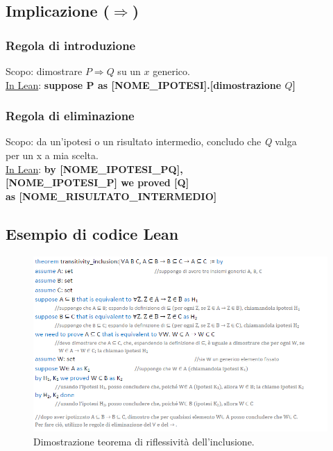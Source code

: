 \documentclass[12pt]{article}
\begin{document}
\subsection{Implicazione ($\Rightarrow$)}
\subsubsection{Regola di introduzione}
Scopo: dimostrare $P \Rightarrow Q$ su un $x$ generico.\\
\underline{In Lean}: \textbf{suppose P as [NOME\_IPOTESI].[dimostrazione $Q$]}
\subsubsection{Regola di eliminazione}
Scopo: da un'ipotesi o un risultato intermedio, concludo che \textit{Q} valga\\
per un x a mia scelta.\\
\underline{In Lean}: 
\textbf{by [NOME\_IPOTESI\_PQ],}\\
\textbf{[NOME\_IPOTESI\_P] we proved [Q]}\\
\textbf{as [NOME\_RISULTATO\_INTERMEDIO]}
\pagebreak
\subsection{Esempio di codice Lean}
\begin{figure}[!htb]
    \centering
    \includegraphics[height=.50\textheight,keepaspectratio]{lezione_1.50/lean_sample_code.PNG} %
    \begin{center}
        \caption{\label{fig:lean_sample_code}Dimostrazione teorema di riflessività dell'inclusione.} %
    \end{center}
\end{figure}
\end{document}
